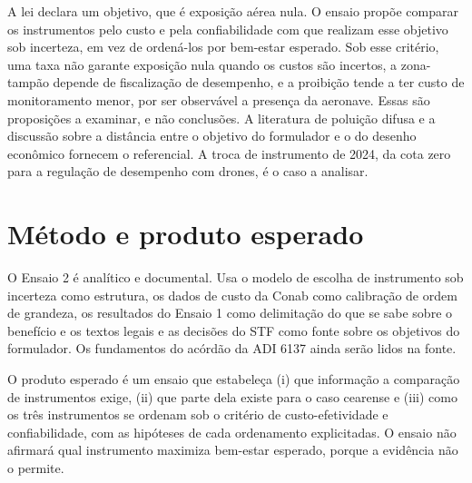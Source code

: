 A lei declara um objetivo, que é exposição aérea nula. O ensaio propõe comparar
os instrumentos pelo custo e pela confiabilidade com que realizam esse
objetivo sob incerteza, em vez de ordená-los por bem-estar esperado. Sob esse
critério, uma taxa não garante exposição nula quando os custos são incertos, a
zona-tampão depende de fiscalização de desempenho, e a proibição tende a ter custo de
monitoramento menor, por ser observável a presença da aeronave. Essas são
proposições a examinar, e não conclusões. A literatura de
poluição difusa \cite{segerson1988,helfand1995} e a discussão sobre a distância
entre o objetivo do formulador e o do desenho econômico
\cite{hitzig2020normative} fornecem o referencial. A troca de instrumento de
2024, da cota zero para a regulação de desempenho com drones, é o caso a
analisar.

\section{Método e produto esperado}
\label{sec:e2-metodo}

O Ensaio 2 é analítico e documental. Usa o modelo de escolha de instrumento
sob incerteza como estrutura, os dados de custo da Conab como calibração de
ordem de grandeza, os resultados do Ensaio 1 como delimitação do que se sabe
sobre o benefício e os textos legais e as decisões do STF como fonte sobre os
objetivos do formulador. Os fundamentos do acórdão da ADI 6137 ainda serão
lidos na fonte.

O produto esperado é um ensaio que estabeleça (i) que informação a comparação
de instrumentos exige, (ii) que parte dela existe para o caso cearense e (iii)
como os três instrumentos se ordenam sob o critério de custo-efetividade e
confiabilidade, com as hipóteses de cada ordenamento explicitadas. O ensaio não
afirmará qual instrumento maximiza bem-estar esperado, porque a evidência não o
permite.
